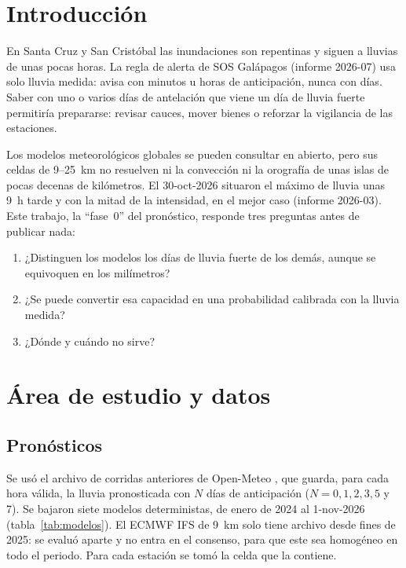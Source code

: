 \documentclass{sosg-informe}
\begin{document}
\section{Introducción}

En Santa Cruz y San Cristóbal las inundaciones son repentinas y siguen a lluvias de unas pocas horas. La regla de alerta de SOS Galápagos (informe 2026-07) usa solo lluvia medida: avisa con minutos u horas de anticipación, nunca con días. Saber con uno o varios días de antelación que viene un día de lluvia fuerte permitiría prepararse: revisar cauces, mover bienes o reforzar la vigilancia de las estaciones.

Los modelos meteorológicos globales se pueden consultar en abierto, pero sus celdas de 9--25~km no resuelven ni la convección ni la orografía de unas islas de pocas decenas de kilómetros. El 30-oct-2026 situaron el máximo de lluvia unas 9~h tarde y con la mitad de la intensidad, en el mejor caso (informe 2026-03). Este trabajo, la \enquote{fase~0} del pronóstico, responde tres preguntas antes de publicar nada:
\begin{enumerate}
  \item ¿Distinguen los modelos los días de lluvia fuerte de los demás, aunque se equivoquen en los milímetros?
  \item ¿Se puede convertir esa capacidad en una probabilidad calibrada con la lluvia medida?
  \item ¿Dónde y cuándo no sirve?
\end{enumerate}

\section{Área de estudio y datos}

\subsection{Pronósticos}
Se usó el archivo de corridas anteriores de Open-Meteo \citep{zippenfenig2023}, que guarda, para cada hora válida, la lluvia pronosticada con $N$ días de anticipación ($N = 0, 1, 2, 3, 5$ y 7). Se bajaron siete modelos deterministas, de enero de 2024 al 1-nov-2026 (tabla~\ref{tab:modelos}). El ECMWF IFS de 9~km solo tiene archivo desde fines de 2025: se evaluó aparte y no entra en el consenso, para que este sea homogéneo en todo el periodo. Para cada estación se tomó la celda que la contiene.
\end{document}

